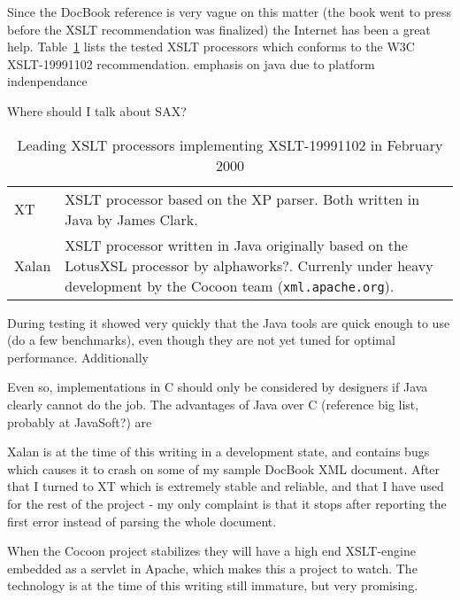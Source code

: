 Since the DocBook reference is very vague on this matter (the book
went to press before the XSLT recommendation was finalized) the
Internet has been a great help.
Table~\ref{tab:leading-xslt-processors} lists the \textsf{tested XSLT
  processors} which conforms to the W3C \textsf{XSLT-19991102}
recommendation.  \textsf{emphasis on java due to platform indenpendance}

\textsf{Where should I talk about SAX?}

\begin{table}[htbp]
  \begin{center}
    \begin{tabular}{|l|p{10cm}|}

      \hline\hline
      
      XT &  XSLT processor based on the XP parser.  Both
      written in Java\textsf{ by James Clark}. \\

      Xalan & XSLT processor written in Java originally based on the
      LotusXSL processor by \textsf{alphaworks?}.   Currenly under
      heavy development by the Cocoon team 
      (\texttt{xml.apache.org}). \\
      
      \hline
    \end{tabular}
    \caption{Leading XSLT processors implementing
      \textsf{XSLT-19991102} in February 2000} 
    \label{tab:leading-xslt-processors}
  \end{center}
\end{table}

During testing it showed very quickly that the Java tools are quick
enough to use (\textsf{do a few benchmarks}), even though they are not
yet tuned for optimal performance.  Additionally 


Even so, implementations in C
should only be considered by designers if Java clearly cannot do the
job.  The advantages of Java over C (\textsf{reference big list,
  probably at JavaSoft?}) are 

Xalan is at the time of this writing in a development state, and
contains bugs which causes it to crash on some of my sample DocBook
XML document.  After that I turned to XT which is extremely stable and
reliable, and that I have used for the rest of the project - my only
complaint is that it stops after reporting the first error instead of
parsing the whole document.


When the Cocoon project stabilizes they will have a
high end XSLT-engine embedded as a servlet in Apache, which makes this
a project to watch.  The technology is at the time of this writing
still immature, but very promising.

